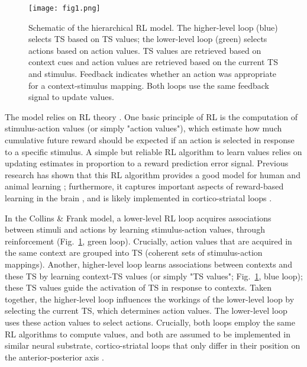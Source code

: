 \documentclass[10pt, letterpaper]{article}
\begin{document}
\begin{figure}[ht]
    \begin{center}
	\texttt{[image: fig1.png]}
    \end{center}
    \caption{Schematic of the hierarchical RL model. The higher-level loop (blue) selects TS based on TS values; the lower-level loop (green) selects actions based on action values. TS values are retrieved based on context cues and action values are retrieved based on the current TS and stimulus. Feedback indicates whether an action was appropriate for a context-stimulus mapping. Both loops use the same feedback signal to update values.} 
    \label{figure:2loops}
\end{figure}

The model relies on RL theory \cite{sutton_reinforcement_2017}. One basic principle of RL is the computation of stimulus-action values (or simply "action values"), which estimate how much cumulative future reward should be expected if an action is selected in response to a specific stimulus. A simple but reliable RL algorithm to learn values relies on updating estimates in proportion to a reward prediction error signal. Previous research has shown that this RL algorithm provides a good model for human and animal learning \cite{daw_model-based_2011}; furthermore, it captures important aspects of reward-based learning in the brain \cite{schultz_neural_1997}, and is likely implemented in cortico-striatal loops \cite{alexander_parallel_1986}.

In the Collins \& Frank model, a lower-level RL loop acquires associations between stimuli and actions by learning stimulus-action values, through reinforcement (Fig.~\ref{figure:2loops}, green loop). Crucially, action values that are acquired in the same context are grouped into TS (coherent sets of stimulus-action mappings). Another, higher-level loop learns associations between contexts and these TS by learning context-TS values (or simply "TS values"; Fig.~\ref{figure:2loops}, blue loop); these TS values guide the activation of TS in response to contexts. Taken together, the higher-level loop influences the workings of the lower-level loop by selecting the current TS, which determines action values. The lower-level loop uses these action values to select actions. Crucially, both loops employ the same RL algorithms to compute values, and both are assumed to be implemented in similar neural substrate, cortico-striatal loops that only differ in their position on the anterior-posterior axis \cite{alexander_parallel_1986}.
\end{document}
